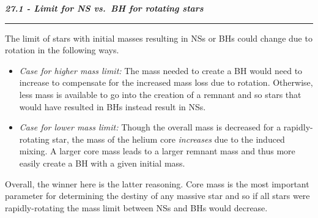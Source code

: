 \documentclass[12pt, letterpaper, twoside]{article}
\newcommand{\question}[1]{{\noindent \it #1}}
\newcommand{\answer}[1]{
    \par\noindent\rule{\textwidth}{0.4pt}#1\vspace{0.5cm}
}
\begin{document}
\question{\textbf{27.1 - Limit for NS vs.\ BH for rotating stars}}
\answer{
    The limit of stars with initial masses resulting in NSs or BHs could change due to rotation in the following ways.

    \begin{itemize}
        \item \textit{Case for higher mass limit:} The mass needed to create a BH would need to increase to compensate for the increased mass loss due to rotation. Otherwise, less mass is available to go into the creation of a remnant and so stars that would have resulted in BHs instead result in NSs.
        \item \textit{Case for lower mass limit:} Though the overall mass is decreased for a rapidly-rotating star, the mass of the helium core \textit{increases} due to the induced mixing. A larger core mass leads to a larger remnant mass and thus more easily create a BH with a given initial mass.
    \end{itemize}
    Overall, the winner here is the latter reasoning. Core mass is the most important parameter for determining the destiny of any massive star and so if all stars were rapidly-rotating the mass limit between NSs and BHs would decrease.
}
\end{document}
